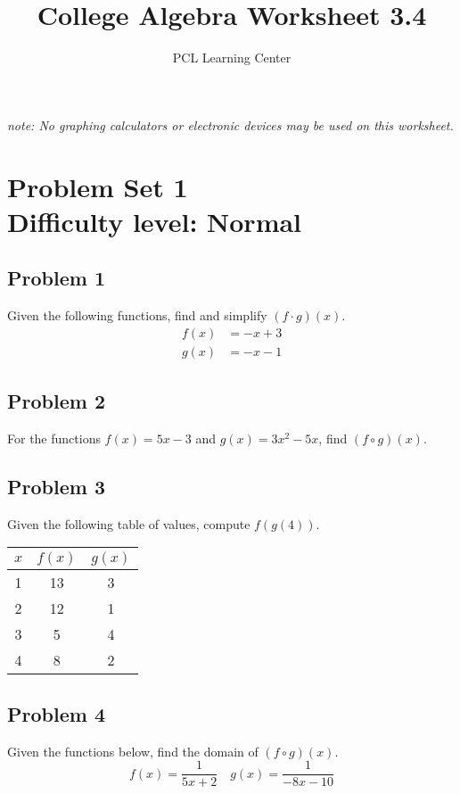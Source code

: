 \documentclass[12pt]{article}
\title{College Algebra Worksheet 3.4}
\author{PCL Learning Center}
\date{}
\begin{document}
\maketitle

\begin{center}
    \textit{note: No graphing calculators or electronic devices may be used on this worksheet.}    
\end{center}

\section*{Problem Set 1\\Difficulty level: Normal}
\subsection*{Problem 1}
Given the following functions, find and simplify \( (f \cdot g)(x) \).
\begin{align*}
    f(x)&=-x+3\\
    g(x)&=-x-1
\end{align*}

\subsection*{Problem 2}
For the functions \( f(x) = 5x - 3 \) and \( g(x) = 3x^2 - 5x \), find \( (f \circ g)(x) \).

\subsection*{Problem 3}
Given the following table of values, compute \( f(g(4)) \).
\begin{center}
\begin{tabular}{|c|c|c|}
\hline
\( x \) & \( f(x) \) & \( g(x) \) \\ \hline
1 & 13 & 3 \\ \hline
2 & 12 & 1 \\ \hline
3 & 5 & 4 \\ \hline
4 & 8 & 2 \\ \hline
\end{tabular}
\end{center}

\subsection*{Problem 4}
Given the functions below, find the domain of \( (f \circ g)(x) \).
\[ f(x) = \dfrac{1}{5x + 2} \quad g(x) = \dfrac{1}{-8x - 10} \]
\end{document}
